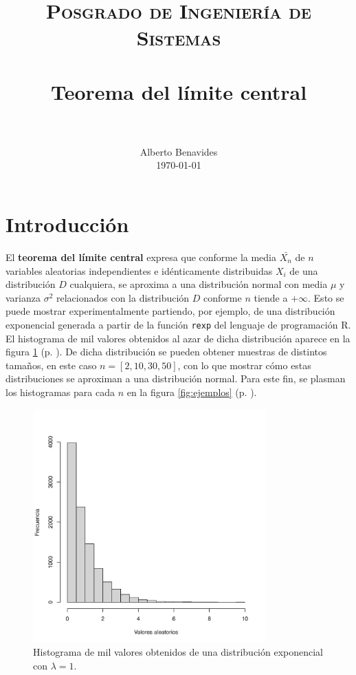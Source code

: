 \documentclass[paper=leter, fontsize=11pt]{scrartcl}
\title{
		\usefont{OT1}{bch}{b}{n}
		\normalfont \normalsize \textsc{Posgrado de Ingeniería de Sistemas} \\ [25pt]
		\horrule{0.5pt} \\[0.4cm]
		\huge Teorema del límite central \\
		\horrule{2pt} \\[0.5cm]
}
\author{
		\normalfont 								\normalsize
        Alberto Benavides\\[-3pt]		\normalsize
        \today
}
\date{}
\begin{document}
 
\maketitle

\section{Introducción}

El \textbf{teorema del límite central} expresa que conforme la media $\bar{X_n}$ de $n$ variables aleatorias independientes e idénticamente distribuidas $X_i$ de una distribución $D$ cualquiera, se aproxima a una distribución normal con media $\mu$ y varianza $\sigma^2$ relacionados con la distribución $D$ conforme $n$ tiende a $+\infty$. Esto se puede mostrar experimentalmente partiendo, por ejemplo, de una distribución exponencial generada a partir de la función \texttt{rexp} del lenguaje de programación R. El histograma de mil valores obtenidos al azar de dicha distribución aparece en la figura \ref{fig:rexp} (p. \pageref{fig:rexp}). De dicha distribución se pueden obtener muestras de distintos tamaños, en este caso $n = [2, 10, 30, 50]$, con lo que mostrar cómo estas distribuciones se aproximan a una distribución normal. Para este fin, se plasman los histogramas para cada $n$ en la figura \ref{fig:ejemplos} (p. \pageref{fig:ejemplos}).

\begin{figure}
  \centering
  \includegraphics[width=0.8\textwidth]{rexp.pdf}
\caption{Histograma de mil valores obtenidos de una distribución exponencial con $\lambda = 1$.}
\label{fig:rexp}
\end{figure}
\end{document}
